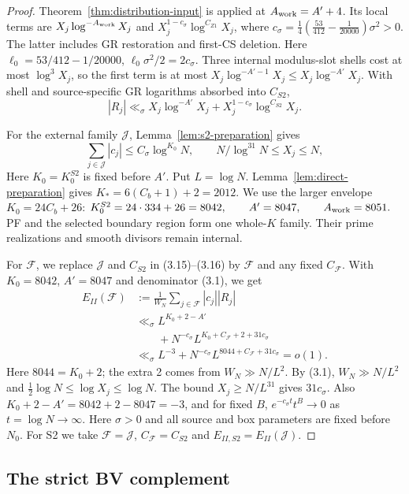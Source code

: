 \begin{proof}
Theorem~\ref{thm:distribution-input} is applied at $A_{\rm work}=A'+4$.
Its local terms are $X_j\log^{-A_{\rm work}}X_j$ and
$X_j^{1-c_\sigma}\log^{C_{Z1}}X_j$, where
$c_\sigma=\frac14(\frac{53}{412}-\frac1{20000})\sigma^2>0$.
The latter includes GR restoration and first-CS deletion.
Here $\ell_0=53/412-1/20000$, $\ell_0\sigma^2/2=2c_\sigma$.
Three internal modulus-slot shells cost at most $\log^3X_j$, so the first term is at most
$X_j\log^{-A'-1}X_j\le X_j\log^{-A'}X_j$.
With shell and source-specific GR logarithms absorbed into $C_{S2}$,
\[
 |R_j|\ll_\sigma X_j\log^{-A'}X_j
       +X_j^{1-c_\sigma}\log^{C_{S2}}X_j.
 \tag{3.15}
\]

For the external family $\mathcal J$, Lemma~\ref{lem:s2-preparation} gives
\[
 \sum_{j\in\mathcal J}|c_j|\le C_\sigma\log^{K_0}N,
 \qquad N/\log^{31}N\le X_j\le N,
 \tag{3.16}
\]
Here $K_0=K_0^{S2}$ is fixed before $A'$.
Put $L=\log N$.
Lemma~\ref{lem:direct-preparation} gives
$K_*=6(C_b+1)+2=2012$.
We use the larger envelope $K_0=24C_b+26$:
$K_0^{S2}=24\cdot334+26=8042,\qquad
 A'=8047,\qquad A_{\rm work}=8051.$
PF and the selected boundary region form one whole-$K$ family.
Their prime realizations and smooth divisors remain internal.

For $\mathscr F$, we replace $\mathcal J$ and $C_{S2}$ in (3.15)--(3.16)
by $\mathscr F$ and any fixed $C_{\mathscr F}$.
With $K_0=8042$, $A'=8047$ and denominator (3.1), we get
\[
 \begin{aligned}
 E_{II}(\mathscr F)&:=\frac1{W_N}\sum_{j\in\mathscr F}|c_j||R_j|\\
 &\ll_\sigma L^{K_0+2-A'}\\
 &\qquad+N^{-c_\sigma}L^{K_0+C_{\mathscr F}+2+31c_\sigma}\\
 &\ll_\sigma L^{-3}+N^{-c_\sigma}L^{8044+C_{\mathscr F}+31c_\sigma}=o(1).
 \end{aligned}
 \tag{3.17}
\]
Here $8044=K_0+2$; the extra 2 comes from $W_N\gg N/L^2$.
By (3.1), $W_N\gg N/L^2$ and
$\tfrac12\log N\le\log X_j\le\log N$.
The bound $X_j\ge N/L^{31}$ gives $31c_\sigma$.
Also $K_0+2-A'=8042+2-8047=-3$,
and for fixed $B$, $e^{-c_\sigma t}t^B\to0$ as $t=\log N\to\infty$.
Here $\sigma>0$ and all source and box parameters are fixed before $N_0$.
For S2 we take $\mathscr F=\mathcal J$, $C_{\mathscr F}=C_{S2}$ and
$E_{II,S2}=E_{II}(\mathcal J)$.
\end{proof}

\subsection{The strict BV complement}
\label{sec:s2-5}

